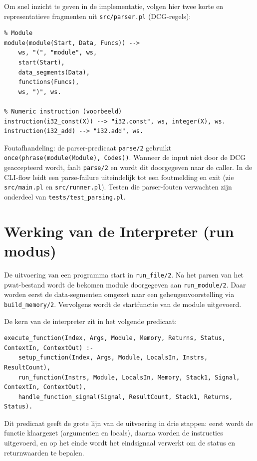 \documentclass[a4paper,11pt]{article}
\begin{document}
Om snel inzicht te geven in de implementatie, volgen hier twee korte en representatieve fragmenten uit \texttt{src/parser.pl} (DCG-regels):

\begin{lstlisting}
% Module
module(module(Start, Data, Funcs)) -->
    ws, "(", "module", ws,
    start(Start),
    data_segments(Data),
    functions(Funcs),
    ws, ")", ws.

% Numeric instruction (voorbeeld)
instruction(i32_const(X)) --> "i32.const", ws, integer(X), ws.
instruction(i32_add) --> "i32.add", ws.
\end{lstlisting}

Foutafhandeling: de parser-predicaat \texttt{parse/2} gebruikt \texttt{once(phrase(module(Module), Codes))}. Wanneer de input niet door de DCG geaccepteerd wordt, faalt \texttt{parse/2} en wordt dit doorgegeven naar de caller. In de CLI-flow leidt een parse-failure uiteindelijk tot een foutmelding en exit (zie \texttt{src/main.pl} en \texttt{src/runner.pl}). Testen die parser-fouten verwachten zijn onderdeel van \texttt{tests/test\_parsing.pl}.




\section{Werking van de Interpreter (run modus)}

De uitvoering van een programma start in \texttt{run\_file/2}. Na het parsen van het pwat-bestand wordt de
bekomen module doorgegeven aan \texttt{run\_module/2}. Daar worden eerst de data-segmenten omgezet naar een
geheugenvoorstelling via \texttt{build\_memory/2}. Vervolgens wordt de startfunctie van de module uitgevoerd.

De kern van de interpreter zit in het volgende predicaat:

\begin{verbatim}
execute_function(Index, Args, Module, Memory, Returns, Status, ContextIn, ContextOut) :-
    setup_function(Index, Args, Module, LocalsIn, Instrs, ResultCount),
    run_function(Instrs, Module, LocalsIn, Memory, Stack1, Signal, ContextIn, ContextOut),
    handle_function_signal(Signal, ResultCount, Stack1, Returns, Status).
\end{verbatim}

Dit predicaat geeft de grote lijn van de uitvoering in drie stappen: eerst wordt de functie klaargezet
(argumenten en locals), daarna worden de instructies uitgevoerd, en op het einde wordt het eindsignaal
verwerkt om de status en returnwaarden te bepalen.
\end{document}
